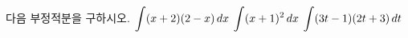 다음 부정적분을 구하시오.
 $\displaystyle\int (x+2)(2-x)\mkern3mu dx$
 $\displaystyle\int (x+1)^2\mkern3mu dx$
 $\displaystyle\int (3t-1)(2t+3)\mkern3mu dt$
